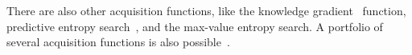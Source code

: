 
There are also other acquisition functions, like the knowledge gradient~\cite{scott2011correlated} function, predictive entropy search~\cite{hernandez2014predictive}, and the max-value entropy search\cite{wang2017max}. A portfolio of several acquisition functions is also possible~\cite{hoffman2011portfolio}.
